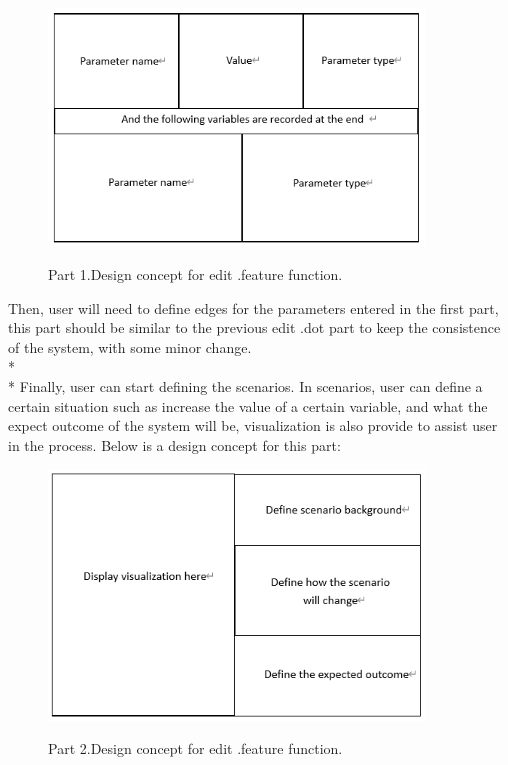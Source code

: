 \begin{figure}[H]
	\centering
	\includegraphics[width=10cm]{figures/editFeature1.png}\\
	\caption{Part 1.Design concept for edit .feature function.}
	\label{fig:figure7}
\end{figure}
Then, user will need to define edges for the parameters entered in the first part, this part should be similar to the previous edit .dot part to keep the consistence of the system, with some minor change.\\*\\*
Finally, user can start defining the scenarios. In scenarios, user can define a certain situation such as increase the value of a certain variable, and what the expect outcome of the system will be, visualization is also provide to assist user in the process. Below is a design concept for this part:

\begin{figure}[H]
	\centering
	\includegraphics[width=10cm]{figures/editFeature2.png}\\
	\caption{Part 2.Design concept for edit .feature function.}
	\label{fig:figure8}
\end{figure}





